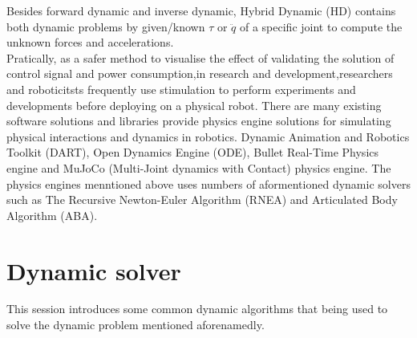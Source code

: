 \documentclass[report.tex]{subfiles}
\begin{document}
    Besides forward dynamic and inverse dynamic, Hybrid Dynamic (HD) contains both dynamic problems by given/known $\tau$ or $\ddot{q}$ of a specific joint to compute the unknown forces and accelerations.\\
    Pratically, as a safer method to visualise the effect of validating the solution of control signal and power consumption,in research and development,researchers and roboticitsts frequently use stimulation to perform experiments and developments before deploying on a physical robot. There are many existing software solutions and libraries provide physics engine solutions for simulating physical interactions and dynamics in robotics. Dynamic Animation and Robotics Toolkit (DART)\cite{Lee2018}, Open Dynamics Engine (ODE)\cite{ODE}, Bullet Real-Time Physics engine\cite{Admin_2022} and MuJoCo (Multi-Joint dynamics with Contact) physics engine\cite{MuJoCo}. The physics engines menntioned above uses numbers of aformentioned dynamic solvers such as The Recursive Newton-Euler Algorithm (RNEA) and Articulated Body Algorithm (ABA).

    \section{Dynamic solver}
    This session introduces some common dynamic algorithms that being used to solve the dynamic problem mentioned aforenamedly.
\end{document}

